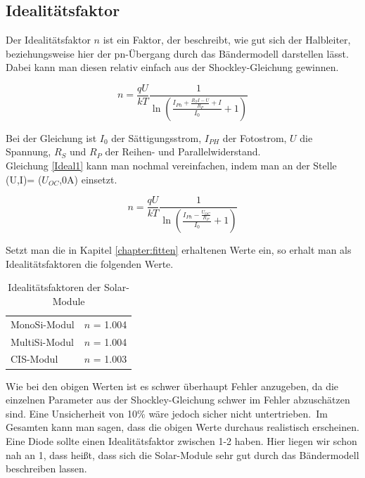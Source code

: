 \clearpage

\subsection{Idealitätsfaktor}

Der Idealitätsfaktor $n$ ist ein Faktor, der beschreibt, wie gut sich der Halbleiter, beziehungsweise hier der pn-Übergang durch das Bändermodell 
darstellen lässt. Dabei kann man diesen relativ einfach aus der Shockley-Gleichung gewinnen.

\begin{equation}
    n =  \frac{qU}{kT} \frac{1}{\ln{(\frac{I_{Ph}+\frac{R_S I -U}{R_P}+I}{I_0}+1)}}
    \label{Ideal1}
\end{equation}

Bei der Gleichung ist $I_0$ der Sättigungsstrom, $I_{PH}$ der Fotostrom, $U$ die Spannung, $R_{S}$ und $R_{P}$ der Reihen- und Parallelwiderstand.\\
Gleichung \ref{Ideal1} kann man nochmal vereinfachen, indem man an der Stelle (U,I)= ($U_{OC}$,0A) einsetzt.

\begin{equation}
    n =  \frac{qU}{kT} \frac{1}{\ln{(\frac{I_{Ph}-\frac{U_{OC}}{R_P}}{I_0}+1)}}
    \label{Ideal2}
\end{equation}

Setzt man die in Kapitel \ref{chapter:fitten} erhaltenen Werte ein, so erhalt man als Idealitätsfaktoren die folgenden Werte.

\begin{table}[h]
    \centering
    \begin{tabular}{l|r}
        MonoSi-Modul & $n$ = 1.004\\
        MultiSi-Modul & $n$ = 1.004\\
        CIS-Modul & $n$ = 1.003\\
    \end{tabular}
    \caption{Idealitätsfaktoren der Solar-Module }
\end{table}

Wie bei den obigen Werten ist es schwer überhaupt Fehler anzugeben, da die einzelnen Parameter aus der Shockley-Gleichung 
schwer im Fehler abzuschätzen sind. Eine Unsicherheit von 10\% wäre jedoch sicher nicht untertrieben.\
Im Gesamten kann man sagen, dass die obigen Werte durchaus realistisch erscheinen. Eine 
Diode sollte einen Idealitätsfaktor zwischen 1-2 haben. Hier liegen wir schon nah an 1, dass 
heißt, dass sich die Solar-Module sehr gut durch das Bändermodell beschreiben lassen.



